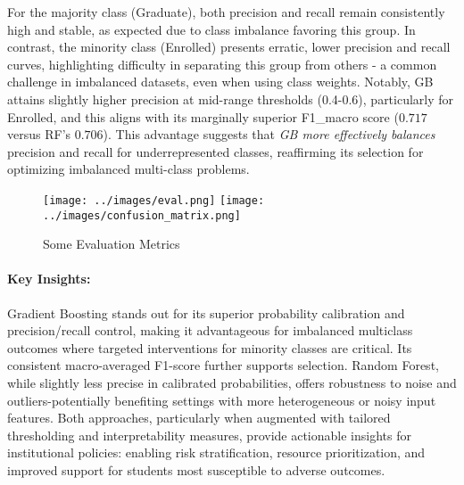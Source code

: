 \documentclass[twoside,final]{hcmut-report}
\begin{document}
For the majority class (Graduate), both precision and recall remain consistently high and stable, as expected due to class imbalance favoring this group. In contrast, the minority class (Enrolled) presents erratic, lower precision and recall curves, highlighting difficulty in separating this group from others - a common challenge in imbalanced datasets, even when using class weights. Notably, GB attains slightly higher precision at mid-range thresholds (0.4-0.6), particularly for Enrolled, and this aligns with its marginally superior F1\_macro score ($0.717$ versus RF's $0.706$). This advantage suggests that \textit{GB more effectively balances} precision and recall for underrepresented classes, reaffirming its selection for optimizing imbalanced multi-class problems.
\begin{figure}[H]
  \centering
  \texttt{[image: ../images/eval.png]}
  \texttt{[image: ../images/confusion\_matrix.png]}
  \caption{Some Evaluation Metrics}
  \label{eval_metrics}
\end{figure}
\paragraph*{Key Insights:} Gradient Boosting stands out for its superior probability calibration and precision/recall control, making it advantageous for imbalanced multiclass outcomes where targeted interventions for minority classes are critical. Its consistent macro-averaged F1-score further supports selection. Random Forest, while slightly less precise in calibrated probabilities, offers robustness to noise and outliers-potentially benefiting settings with more heterogeneous or noisy input features. Both approaches, particularly when augmented with tailored thresholding and interpretability measures, provide actionable insights for institutional policies: enabling risk stratification, resource prioritization, and improved support for students most susceptible to adverse outcomes.
\end{document}
